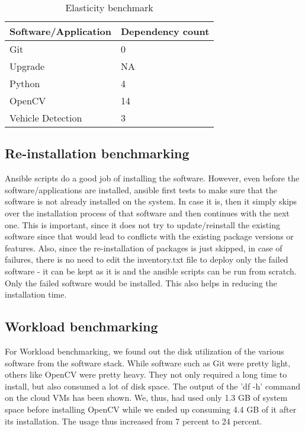 \documentclass[9pt,twocolumn,twoside]{../../styles/osajnl}
\begin{document}
\begin{table}[]
\centering
\caption{Elasticity benchmark}
\label{Table 2}
\begin{tabular}{|l|l|}
\hline
Software/Application & Dependency count \\ \hline
Git & 0 \\ \hline
Upgrade & NA \\ \hline
Python & 4 \\ \hline
OpenCV & 14 \\ \hline
Vehicle Detection & 3 \\ \hline
\end{tabular}
\end{table}

\subsection{Re-installation benchmarking}
Ansible scripts do a good job of installing the software.  However,
even before the software/applications are installed, ansible first
tests to make sure that the software is not already installed on the
system.  In case it is, then it simply skips over the installation
process of that software and then continues with the next one.  This
is important, since it does not try to update/reinstall the existing
software since that would lead to conflicts with the existing package
versions or features.  Also, since the re-installation of packages is
just skipped, in case of failures, there is no need to edit the
inventory.txt file to deploy only the failed software - it can be kept
as it is and the ansible scripts can be run from scratch.  Only the
failed software would be installed.  This also helps in reducing the
installation time.

\subsection{Workload benchmarking}
For Workload benchmarking, we found out the disk utilization of the
various software from the software stack.  While software such as Git
were pretty light, others like OpenCV were pretty heavy.  They not
only required a long time to install, but also consumed a lot of disk
space.  The output of the 'df -h' command on the cloud VMs has been
shown.  We, thus, had used only 1.3 GB of system space before
installing OpenCV while we ended up consuming 4.4 GB of it after its
installation.  The usage thus increased from 7 percent to 24 percent.
\end{document}
